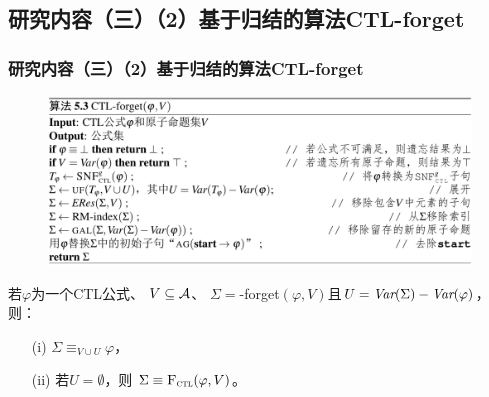 \documentclass[aspectratio=1610, 9pt, CJK]{beamer}
\begin{document}
 

\subsection{研究内容（三）（2）基于归结的算法CTL-forget}
 

\begin{frame}
	\frametitle{研究内容（三）（2）基于归结的算法CTL-forget}
	
	 
			
		\begin{figure}
			\includegraphics[scale=0.4]{figures/CTL-forget1}
		\end{figure}
			\begin{theorem}[可靠性]%
				若$\varphi$为一个CTL公式、 $V\subseteq\cal A$、 $\Sigma=$\CTL-forget$(\varphi,V)$且$U=\textit{Var}(\Sigma)-\textit{Var}(\varphi)$，则：
				\begin{itemize}
					\item[(i)] $\Sigma\equiv_{V\cup U}\varphi$，
					\item[(ii)] 若$U=\emptyset$，则 $\Sigma\equiv{\textsc{F}_{\textsc{ctl}}}(\varphi,V)$。
				\end{itemize}
			\end{theorem}
			
\end{frame}
\end{document}
